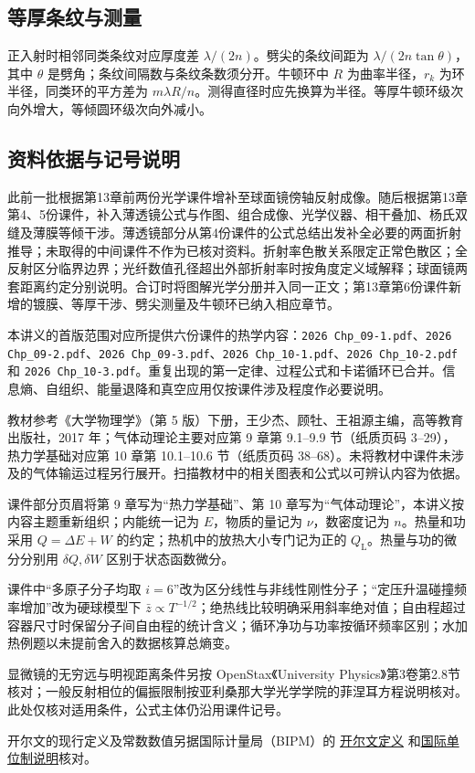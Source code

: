\documentclass[UTF8,fontset=none,zihao=-4,a4paper]{ctexart}
\begin{document}
\subsection{等厚条纹与测量}
正入射时相邻同类条纹对应厚度差 $\lambda/(2n)$。劈尖的条纹间距为 $\lambda/(2n\tan\theta)$，其中 $\theta$ 是劈角；条纹间隔数与条纹条数须分开。牛顿环中 $R$ 为曲率半径，$r_k$ 为环半径，同类环的平方差为 $m\lambda R/n$。测得直径时应先换算为半径。等厚牛顿环级次向外增大，等倾圆环级次向外减小。

\clearpage
\subsection{资料依据与记号说明}
此前一批根据第13章前两份光学课件增补至球面镜傍轴反射成像。随后根据第13章第4、5份课件，补入薄透镜公式与作图、组合成像、光学仪器、相干叠加、杨氏双缝及薄膜等倾干涉。薄透镜部分从第4份课件的公式总结出发补全必要的两面折射推导；未取得的中间课件不作为已核对资料。折射率色散关系限定正常色散区；全反射区分临界边界；光纤数值孔径超出外部折射率时按角度定义域解释；球面镜两套距离约定分别说明。合订时将图解光学分册并入同一正文；第13章第6份课件新增的镀膜、等厚干涉、劈尖测量及牛顿环已纳入相应章节。

{\raggedright
本讲义的首版范围对应所提供六份课件的热学内容：\texttt{2026 Chp\_09-1.pdf}、\texttt{2026 Chp\_09-2.pdf}、\texttt{2026 Chp\_09-3.pdf}、\texttt{2026 Chp\_10-1.pdf}、\texttt{2026 Chp\_10-2.pdf} 和 \texttt{2026 Chp\_10-3.pdf}。重复出现的第一定律、过程公式和卡诺循环已合并。信息熵、自组织、能量退降和真空应用仅按课件涉及程度作必要说明。\par}

教材参考《大学物理学》（第 5 版）下册，王少杰、顾牡、王祖源主编，高等教育出版社，2017 年；气体动理论主要对应第 9 章第 9.1--9.9 节（纸质页码 3--29），热力学基础对应第 10 章第 10.1--10.6 节（纸质页码 38--68）。未将教材中课件未涉及的气体输运过程另行展开。扫描教材中的相关图表和公式以可辨认内容为依据。

课件部分页眉将第 9 章写为“热力学基础”、第 10 章写为“气体动理论”，本讲义按内容主题重新组织；内能统一记为 $E$，物质的量记为 $\nu$，数密度记为 $n$。热量和功采用 $Q=\Delta E+W$ 的约定；热机中的放热大小专门记为正的 $Q_{\mathrm L}$。热量与功的微分分别用 $\delta Q,\delta W$ 区别于状态函数微分。

课件中“多原子分子均取 $i=6$”改为区分线性与非线性刚性分子；“定压升温碰撞频率增加”改为硬球模型下 $\bar z\propto T^{-1/2}$；绝热线比较明确采用斜率绝对值；自由程超过容器尺寸时保留分子间自由程的统计含义；循环净功与功率按循环频率区别；水加热例题以未提前舍入的数据核算总熵变。

显微镜的无穷远与明视距离条件另按 OpenStax《University Physics》第3卷第2.8节核对；一般反射相位的偏振限制按亚利桑那大学光学学院的菲涅耳方程说明核对。此处仅核对适用条件，公式主体仍沿用课件记号。

开尔文的现行定义及常数数值另据国际计量局（BIPM）的
\href{https://www.bipm.org/en/si-base-units/kelvin}{开尔文定义}
和\href{https://www.bipm.org/en/measurement-units}{国际单位制说明}核对。
\end{document}
